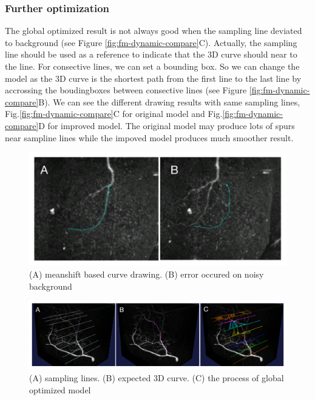 \subsubsection{Further optimization}
The global optimized result is not always good when the sampling line deviated to background (see Figure \ref{fig:fm-dynamic-compare}C). Actually, the sampling line should be used as a reference to indicate that the 3D curve should near to the line. For consective lines, we can set a bounding box. So we can change the model as the 3D curve is the shortest path from the first line to the last line by accrossing the boudingboxes between consective lines (see Figure \ref{fig:fm-dynamic-compare}B). We can see the different drawing results with same sampling lines, Fig.\ref{fig:fm-dynamic-compare}C for original model and Fig.\ref{fig:fm-dynamic-compare}D for improved model. The original model may produce lots of spurs near sampline lines while the impoved model produces much smoother result.

\begin{figure}[htb]
\begin{center}
\includegraphics[width=5in]{images/fm_meanshift_drawing}
\caption{(A) meanshift based curve drawing. (B) error occured on noisy background}
\label{fig:fm-meanshift-drawing} %
\end{center}
\end{figure}

\begin{figure}[htb]
\begin{center}
\includegraphics[width=6in]{images/fm_dynamic_drawing}
\caption{(A) sampling lines. (B) expected 3D curve. (C) the process of global optimized model}
\label{fig:fm-dynamic-drawing}
\end{center}
\end{figure}

